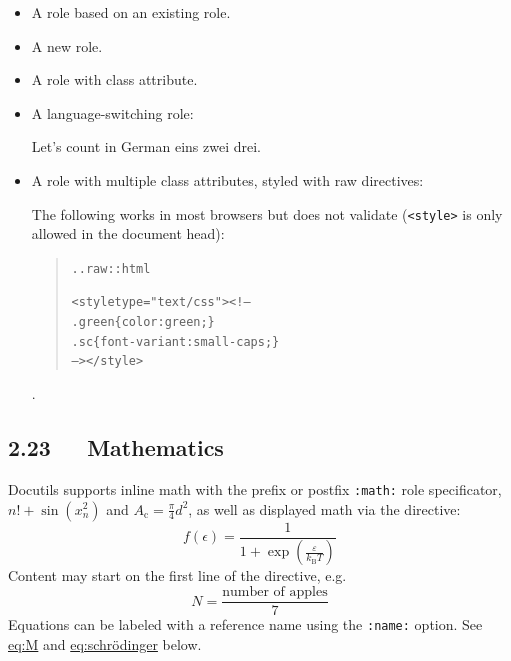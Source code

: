 \documentclass[a4paper]{article}
\begin{document}
\begin{itemize}
\item A role based on an existing role.

\texttt{} \texttt{} \texttt{}

\item A new role.


\item A role with class attribute.


\item A language-switching role:

Let’s count in German \foreignlanguage{german}{eins zwei drei}.

\item A role with multiple class attributes, styled with raw directives:

\newcommand{\DUrolegreen}[1]{\textcolor{green}{#1}}
\newcommand{\DUrolesc}[1]{\textsc{#1}}

The following works in most browsers but does not validate
(\texttt{<style>} is only allowed in the document head):

\begin{quote}
\begin{alltt}
.. raw:: html

  <style type="text/css"><!--
   .green \{color: green;\}
   .sc \{font-variant: small-caps;\}
   --></style>
\end{alltt}
\end{quote}

.
\end{itemize}


\subsection{2.23   Mathematics%
  \label{mathematics}%
}

Docutils supports inline math with the prefix or postfix \texttt{:math:}
role specificator, $n! + \sin(x_n^2)$ and $A_\text{c} =
\frac{\pi}{4} d^2$, as well as displayed math via the
 directive:
%
\begin{equation*}
f(\epsilon) = \frac{1}{1 + \exp\left(\frac{\varepsilon}{k_\text{B}T}\right)}
\end{equation*}
Content may start on the first line of the directive, e.g.
%
\begin{equation*}
N = \frac{\text{number of apples}}{7}
\end{equation*}
Equations can be labeled with a reference name using the \texttt{:name:} option.
See \hyperref[eq-m]{eq:M} and \hyperref[eq-schrodinger]{eq:schrödinger} below.
\end{document}
